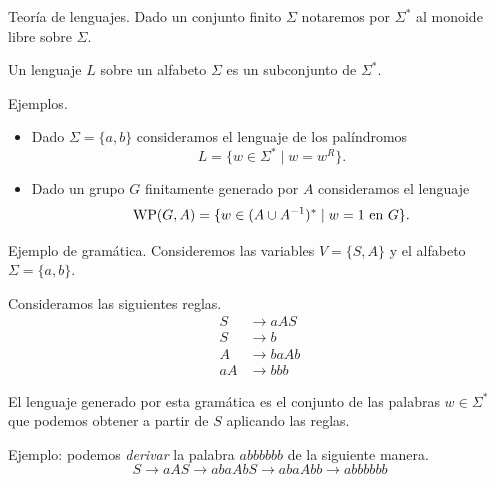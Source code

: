 \documentclass[aspectratio=169, 11pt]{beamer}
\begin{document}
	\begin{frame}[fragile]{Teoría de lenguajes.}
		Dado un conjunto finito $\Sigma$ notaremos por $\Sigma^*$ al monoide libre sobre $\Sigma$.
		
		\begin{deff}
			Un lenguaje $L$ sobre un alfabeto $\Sigma$ es un subconjunto de $\Sigma^*$.
		\end{deff}	
		
		\begin{alertblock}{Ejemplos.}
			\begin{itemize}
				\item 
					Dado $\Sigma = \{a,b\}$ consideramos el lenguaje de los palíndromos
					\[
						L = \{ w \in \Sigma^{*} \mid w = w^{R}  \}.
					\]
				\item 
					Dado un grupo $G$ finitamente generado por $A$ consideramos el lenguaje
					\[
						\text{WP}(G, A) = \{ w \in (A \cup A^{-1})^{*} \mid w = 1 \ \text{en $G$} \}.	
					\]
			\end{itemize}
		\end{alertblock}
	\end{frame}
	
	\begin{frame}[fragile]{Ejemplo de gramática.}
		Consideremos las variables $V =\{ S,A \}$ y el alfabeto $\Sigma = \{ a,b \}$.

		Consideramos las siguientes reglas.
		\begin{align*}
			S  & \to aAS  \\
			S  & \to b    \\
			A  & \to baAb \\
			aA & \to bbb
		\end{align*}

		El lenguaje generado por esta gramática es el conjunto de las palabras $w \in \Sigma^{*}$ que podemos obtener a partir de $S$ aplicando las reglas.

		Ejemplo: podemos \emph{derivar} la palabra $abbbbbb$ de la siguiente manera.  
		\[
			S \to aAS \to abaAbS \to abaAbb \to abbbbbb	
		\]
	\end{frame}
\end{document}
